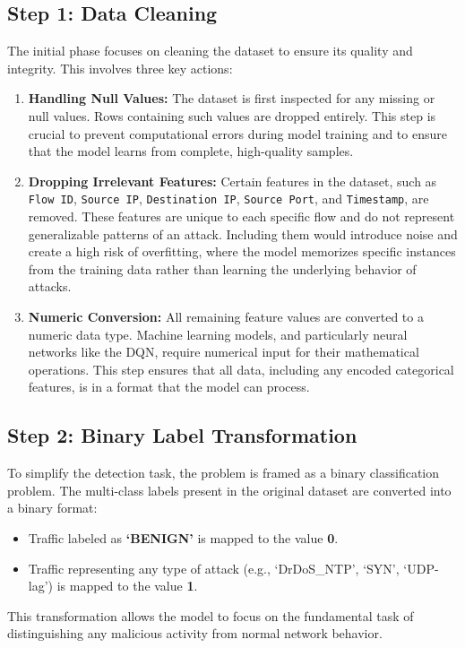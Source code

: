 \documentclass{report}
\begin{document}
\subsection{Step 1: Data Cleaning}
The initial phase focuses on cleaning the dataset to ensure its quality and integrity. This involves three key actions:
\begin{enumerate}
    \item \textbf{Handling Null Values:} The dataset is first inspected for any missing or null values. Rows containing such values are dropped entirely. This step is crucial to prevent computational errors during model training and to ensure that the model learns from complete, high-quality samples.

    \item \textbf{Dropping Irrelevant Features:} Certain features in the dataset, such as \texttt{Flow ID}, \texttt{Source IP}, \texttt{Destination IP}, \texttt{Source Port}, and \texttt{Timestamp}, are removed. These features are unique to each specific flow and do not represent generalizable patterns of an attack. Including them would introduce noise and create a high risk of overfitting, where the model memorizes specific instances from the training data rather than learning the underlying behavior of attacks.

    \item \textbf{Numeric Conversion:} All remaining feature values are converted to a numeric data type. Machine learning models, and particularly neural networks like the DQN, require numerical input for their mathematical operations. This step ensures that all data, including any encoded categorical features, is in a format that the model can process.
\end{enumerate}

\subsection{Step 2: Binary Label Transformation}
To simplify the detection task, the problem is framed as a binary classification problem. The multi-class labels present in the original dataset are converted into a binary format:
\begin{itemize}
    \item Traffic labeled as \textbf{`BENIGN'} is mapped to the value \textbf{0}.
    \item Traffic representing any type of attack (e.g., `DrDoS\_NTP', `SYN', `UDP-lag') is mapped to the value \textbf{1}.
\end{itemize}
This transformation allows the model to focus on the fundamental task of distinguishing any malicious activity from normal network behavior.
\end{document}
